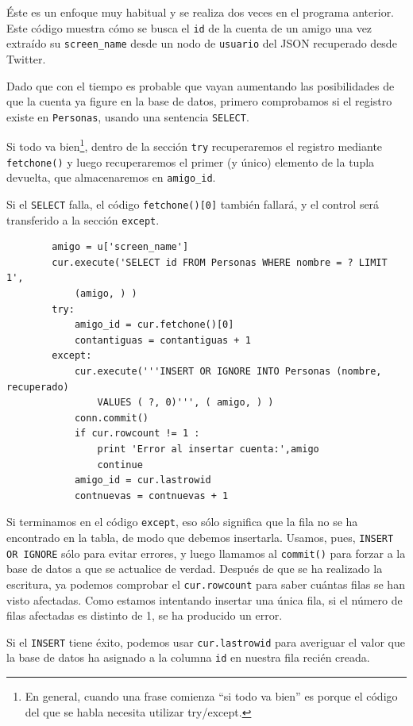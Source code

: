 Éste es un enfoque muy habitual y se realiza dos veces en el programa anterior.
Este código muestra cómo se busca el {\tt id} de la
cuenta de un amigo una vez extraído su \verb"screen_name"
desde un nodo de {\tt usuario} del JSON recuperado desde Twitter.

Dado que con el tiempo es probable que vayan aumentando las posibilidades de que la cuenta
ya figure en la base de datos, primero comprobamos si el registro
existe en {\tt Personas}, usando una sentencia {\tt SELECT}.

Si todo va bien\footnote{En general, cuando una frase comienza
``si todo va bien''	es porque el código del que se habla necesita
utilizar try/except.}, dentro de la sección {\tt try} recuperaremos el
registro mediante {\tt fetchone()} y luego recuperaremos el
primer (y único) elemento de la tupla devuelta, que almacenaremos en
\verb"amigo_id".

Si el {\tt SELECT} falla, el código {\tt fetchone()[0]} también fallará,
y el control será transferido a la sección {\tt except}.

\beforeverb
\begin{verbatim}
        amigo = u['screen_name']
        cur.execute('SELECT id FROM Personas WHERE nombre = ? LIMIT 1',
            (amigo, ) )
        try:
            amigo_id = cur.fetchone()[0]
            contantiguas = contantiguas + 1
        except:
            cur.execute('''INSERT OR IGNORE INTO Personas (nombre, recuperado) 
                VALUES ( ?, 0)''', ( amigo, ) )
            conn.commit()
            if cur.rowcount != 1 :
                print 'Error al insertar cuenta:',amigo
                continue
            amigo_id = cur.lastrowid
            contnuevas = contnuevas + 1
\end{verbatim}
\afterverb
%
Si terminamos en el código {\tt except}, eso sólo significa que la fila
no se ha encontrado en la tabla, de modo que debemos insertarla. Usamos, pues,
{\tt INSERT OR IGNORE} sólo para evitar errores, y luego llamamos al {\tt commit()} para
forzar a la base de datos a que se actualice de verdad. Después de que se ha realizado la escritura,
ya podemos comprobar el {\tt cur.rowcount} para saber cuántas filas se han visto afectadas. Como
estamos intentando insertar una única fila, si el número de
filas afectadas es distinto de 1, se ha producido un error.

Si el {\tt INSERT} tiene éxito, podemos usar {\tt cur.lastrowid}
para averiguar el valor que la base de datos ha asignado a la columna {\tt id}
en nuestra fila recién creada.

